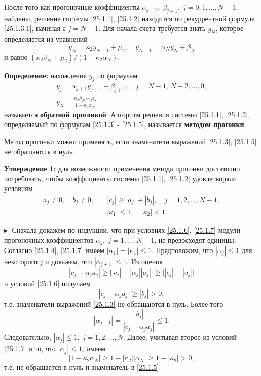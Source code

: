 После того как прогоночные коэффициенты $\alpha_{j+1}, \; \beta_{j+1}, \; j = 0, 1, \ldots, N-1$, найдены, решение системы \eqref{25.1.1}, \eqref{25.1.2} находится по рекуррентной формуле \eqref{25.1.3.1}, начиная с $j = N-1$. Для начала счета требуется знать $y_N$, которое определяется из уравнений 
$$
y_N = \kappa_2 y_{N-1} + \mu_2, \quad y_{N-1} = \alpha_N y_N + \beta_N
$$
и равно $(\kappa_2\beta_N + \mu_2)/(1 - \kappa_2 \alpha_N)$. 

\textbf{Определение:\;} нахождение $y_j$ по формулам
\begin{equation}
    \label{25.1.5}
    \begin{gathered}
        y_j = \alpha_{j+1} y_{j+1} + \beta_{j+1}, \quad j = N-1, \, N-2, \ldots, 0,\\
        y_N = \frac{\kappa_2\beta_N + \mu_2}{1 - \kappa_2 \alpha_N}
    \end{gathered}
\end{equation}
называется \textbf{обратной прогонкой}. Алгоритм решения системы \eqref{25.1.1}, \eqref{25.1.2}, определяемый по формулам \eqref{25.1.3} - \eqref{25.1.5}, называется \textbf{методом прогонки}.

Метод прогонки можно применять, если знаменатели выражений \eqref{25.1.3}, \eqref{25.1.5} не обращаются в нуль. 

\textbf{Утверждение 1:\;} для возможности применения метода прогонки достаточно потребовать, чтобы коэффициенты системы \eqref{25.1.1}, \eqref{25.1.2} удовлетворяли условиям
\begin{align} 
\label{25.1.6}
    a_j \ne 0, \quad b_j \ne 0,\quad &|c_j|\geq|a_j| + |b_j|, \quad j = 1, 2, \ldots, N-1,\\
    \label{25.1.7}
    &|\kappa_1| \leq 1, \quad |\kappa_2| < 1.
\end{align}

$\blacktriangleright\;$ Сначала докажем по индукции, что при условиях \eqref{25.1.6}, \eqref{25.1.7} модули прогоночных коэффициентов $\alpha_j, \; j = 1, \ldots, N-1$, не превосходят единицы. Согласно \eqref{25.1.4}, \eqref{25.1.7} имеем $|\alpha_1| = |\kappa_1| \leq 1$. Предположим, что $|\alpha_j| \leq 1$ для некоторого $j$ и докажем, что $|\alpha_{j+1}| \leq 1$. Из оценок 
$$
|c_j - \alpha_j a_j| \geq \big| |c_j| - |\alpha_j| |a_j|\big| \geq \big||c_j| - |a_j|\big|
$$
и условий \eqref{25.1.6} получаем 
$$
|c_j - \alpha_j a_j| \geq |b_j| > 0,
$$
т.е. знаменатели выражений \eqref{25.1.3} не обращаются в нуль. Более того
$$
|\alpha_{j+1}| = \frac{|b_j|}{|c_j - \alpha_j a_j|} \leq 1.
$$
Следовательно, $|\alpha_j| \leq 1, \; j = 1, 2, \ldots, N$. Далее, учитывая второе из условий \eqref{25.1.7} и то, что $|\alpha_j| \leq 1$, имеем
$$
|1 - \kappa_2 \alpha_N| \geq 1 - |\kappa_2| |\alpha_N| \geq 1 - |\kappa_2| > 0,
$$
т.е. не обращается в нуль и знаменатель в \eqref{25.1.5}. 

